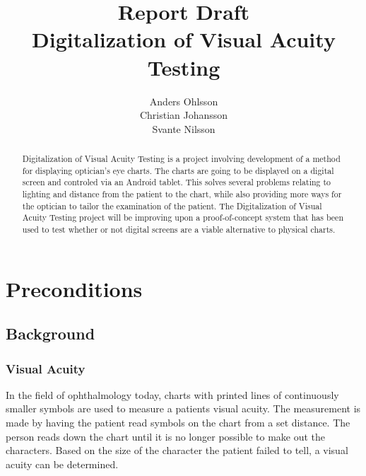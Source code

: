 \documentclass[12pt,a4paper,notitlepage]{report}
\begin{document}
\title{Report Draft\\Digitalization of Visual Acuity Testing}
\author{Anders Ohlsson\\Christian Johansson\\Svante Nilsson}
\maketitle

\begin{abstract}
Digitalization of Visual Acuity Testing is a project involving development of a method for displaying optician's eye charts. The charts are going to be displayed on a digital screen and controled via an Android tablet. This solves several problems relating to lighting and distance from the patient to the chart, while also providing more ways for the optician to tailor the examination of the patient. The Digitalization of Visual Acuity Testing project will be improving upon a proof-of-concept system that has been used to test whether or not digital screens are a viable alternative to physical charts.
\end{abstract}
\thispagestyle{empty}
\clearpage

\setcounter{page}{1}
\chapter{Preconditions}
\section{Background}
\subsection{Visual Acuity}
In the field of ophthalmology today, charts with printed lines of continuously smaller symbols are used to measure a patients visual acuity. The measurement is made by having the patient read symbols on the chart from a set distance. The person reads down the chart until it is no longer possible to make out the characters. Based on the size of the character the patient failed to tell, a visual acuity can be determined. 

\end{document}
